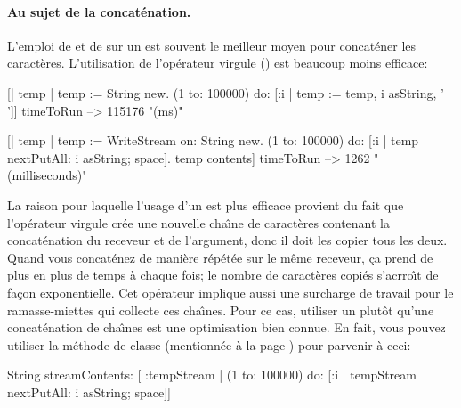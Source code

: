 \documentclass[a4paper,10pt,twoside]{book}
\begin{document}
\paragraph{Au sujet de la concat\'enation.}
L'emploi de  et de  sur un  est souvent le meilleur moyen pour concat\'ener 
les caract\`eres.
L'utilisation de l'op\'erateur virgule (\ct{,}) est beaucoup moins efficace:

\begin{code}{}
[| temp |
  temp := String new.
  (1 to: 100000)
    do: [:i | temp := temp, i asString, ' ']] timeToRun --> 115176 "(ms)"

[| temp |
  temp := WriteStream on: String new.
  (1 to: 100000)
    do: [:i | temp nextPutAll: i asString; space].
  temp contents] timeToRun --> 1262 "(milliseconds)"
\end{code}

La raison pour laquelle l'usage d'un \stream est plus efficace provient
du fait que l'op\'erateur virgule cr\'ee une nouvelle cha\^{\i}ne de caract\`eres
contenant la concat\'enation du receveur et de l'argument, donc il doit
les copier tous les deux.
Quand vous concat\'enez de mani\`ere r\'ep\'et\'ee sur le m\^eme receveur,
	  \c{c}a prend de plus en plus de temps \`a chaque fois; le nombre
	  de caract\`eres copi\'es s'acrro\^{\i}t de fa\c{c}on exponentielle.
Cet op\'erateur implique aussi une surcharge de travail pour le ramasse-miettes qui collecte ces cha\^{\i}nes. 
Pour ce cas, utiliser un \stream plut\^ot qu'une concat\'enation de cha\^{\i}nes est une optimisation bien connue.
En fait, vous pouvez utiliser la m\'ethode de classe  (mentionn\'ee \`a la page \pageref{sec:streamContents}) pour parvenir \`a ceci:

\begin{code}{}
String streamContents: [ :tempStream |
  (1 to: 100000)
       do: [:i | tempStream nextPutAll: i asString; space]] 
\end{code}
\end{document}
